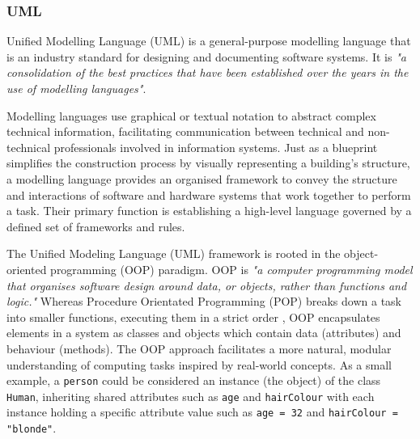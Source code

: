 \documentclass{article}
\begin{document}
{\subsubsection{UML}

Unified Modelling Language (UML) is a general-purpose modelling language that is an industry standard for designing and documenting software systems. It is \textit{"a consolidation of the best practices that have been established over the years in the use of modelling languages"}\cite{Seidl_Scholz_Huemer_Kappel_Duffy_2014}.

Modelling languages use graphical or textual notation to abstract complex technical information, facilitating communication between technical and non-technical professionals involved in information systems. Just as a blueprint simplifies the construction process by visually representing a building’s structure, a modelling language provides an organised framework to convey the structure and interactions of software and hardware systems that work together to perform a task\cite{Seidl_Scholz_Huemer_Kappel_Duffy_2014}. Their primary function is establishing a high-level language governed by a defined set of frameworks and rules\cite{Modelinglanguagemean}.

The Unified Modeling Language (UML) framework is rooted in the object-oriented programming (OOP) paradigm. OOP is \textit{"a computer programming model that organises software design around data, or objects, rather than functions and logic."}\cite{TechTargetOOP} Whereas Procedure Orientated Programming (POP) breaks down a task into smaller functions, executing them in a strict order \cite{OOPPOP}, OOP encapsulates elements in a system as classes and objects which contain data (attributes) and behaviour (methods)\cite{MediumOOPPOP}. The OOP approach facilitates a more natural, modular understanding of computing tasks inspired by real-world concepts\cite{Seidl_Scholz_Huemer_Kappel_Duffy_2014}. As a small example, a \texttt{person} could be considered an instance (the object) of the class \texttt{Human}, inheriting shared attributes such as \texttt{age} and \texttt{hairColour} with each instance holding a specific attribute value such as \texttt{age = 32} and \texttt{hairColour = "blonde"}.

}
\end{document}
